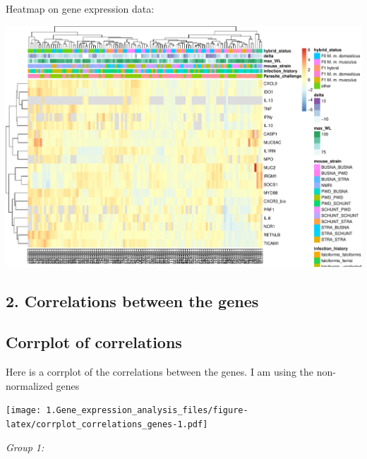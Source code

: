 \documentclass[
]{article}
\newenvironment{Shaded}{\begin{snugshade}}{\end{snugshade}}
\newcommand{\CommentTok}[1]{\textcolor[rgb]{0.56,0.35,0.01}{\textit{#1}}}
\newcommand{\DocumentationTok}[1]{\textcolor[rgb]{0.56,0.35,0.01}{\textbf{\textit{#1}}}}
\newcommand{\FunctionTok}[1]{\textcolor[rgb]{0.00,0.00,0.00}{#1}}
\newcommand{\NormalTok}[1]{#1}
\newcommand{\OtherTok}[1]{\textcolor[rgb]{0.56,0.35,0.01}{#1}}
\newcommand{\SpecialCharTok}[1]{\textcolor[rgb]{0.00,0.00,0.00}{#1}}
\begin{document}
\begin{Shaded}
\end{Shaded}

Heatmap on gene expression data:

\includegraphics{1.Gene_expression_analysis_files/figure-latex/pheatmap_genes-1.pdf}

\hypertarget{correlations-between-the-genes}{%
\subsection{2. Correlations between the
genes}\label{correlations-between-the-genes}}

\hypertarget{corrplot-of-correlations}{%
\subsection{Corrplot of correlations}\label{corrplot-of-correlations}}

Here is a corrplot of the correlations between the genes. I am using the
non-normalized genes

\texttt{[image: 1.Gene\_expression\_analysis\_files/figure-latex/corrplot\_correlations\_genes-1.pdf]}

\emph{Group 1:}
\end{document}
